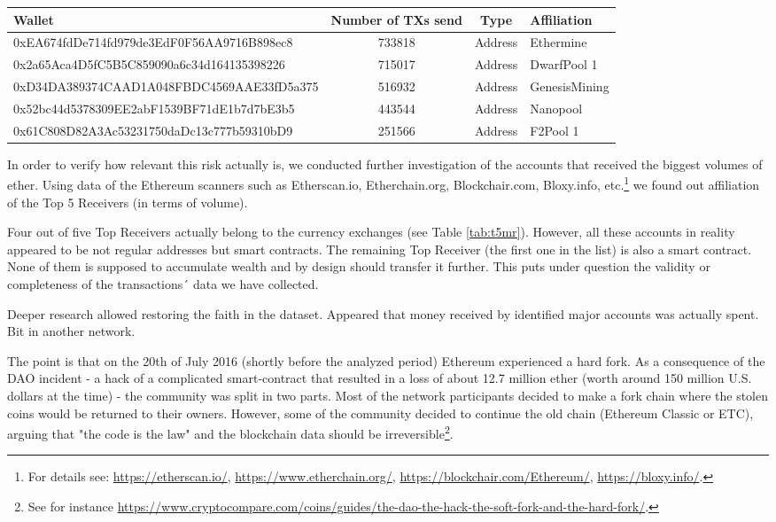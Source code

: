 \begin{table}
\centering
{}
\label{tabt5ms}
\begin{adjustbox}{width=0.9\linewidth}
\begin{tabular}{p{7cm}ccl}
  \hline
Wallet & Number of TXs send & Type & Affiliation \\
  \hline
  0xEA674fdDe714fd979de3EdF0F56AA9716B898ec8 & 733818 & Address & Ethermine \\
  0x2a65Aca4D5fC5B5C859090a6c34d164135398226 & 715017 & Address & DwarfPool 1 \\
  0xD34DA389374CAAD1A048FBDC4569AAE33fD5a375 & 516932 & Address & GenesisMining \\
  0x52bc44d5378309EE2abF1539BF71dE1b7d7bE3b5 & 443544 & Address & Nanopool \\
  0x61C808D82A3Ac53231750daDc13c777b59310bD9 & 251566 & Address & F2Pool 1 \\
   \hline
\end{tabular}
\end{adjustbox}
\end{table}

In order to verify how relevant this risk actually is, we conducted further investigation of the accounts that received the biggest volumes of ether.  
Using data of the Ethereum scanners such as Etherscan.io, Etherchain.org, Blockchair.com, Bloxy.info, etc.\footnote{For details see: \url{https://etherscan.io/}, \url{https://www.etherchain.org/}, \url{https://blockchair.com/Ethereum/}, \url{https://bloxy.info/}.} we found out affiliation of the Top 5 Receivers (in terms of volume).

Four out of five Top Receivers actually belong to the currency exchanges (see Table \ref{tab:t5mr}).
However, all these accounts in reality appeared to be not regular addresses but smart contracts.
The remaining Top Receiver (the first one in the list) is also a smart contract.
None of them is supposed to accumulate wealth and by design should transfer it further.
This puts under question the validity or completeness of the transactions´ data we have collected.

Deeper research allowed restoring the faith in the dataset.
Appeared that money received by identified major accounts was actually spent.
Bit in another network.

The point is that on the 20th of July 2016 (shortly before the analyzed period) Ethereum experienced a hard fork.
As a consequence of the DAO incident - a hack of a complicated smart-contract that resulted in a loss of about 12.7 million ether (worth around 150 million U.S. dollars at the time) - the community was split in two parts.
Most of the network participants decided to make a fork chain where the stolen coins would be returned to their owners.
However, some of the community decided to continue the old chain (Ethereum Classic or ETC), arguing that "the code is the law" and the blockchain data should be irreversible\footnote{See for instance \url{https://www.cryptocompare.com/coins/guides/the-dao-the-hack-the-soft-fork-and-the-hard-fork/}.}.

